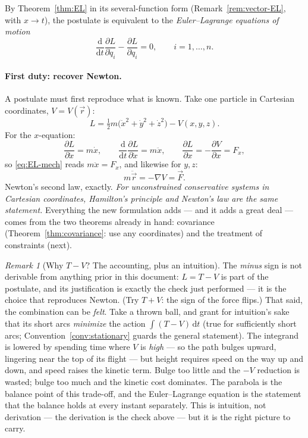 \documentclass[11pt]{article}
\theoremstyle{plain}
\theoremstyle{definition}
\theoremstyle{remark}
\newtheorem{remark}[theorem]{Remark}
\newcommand{\dd}{\mathrm{d}}
\newcommand{\pd}[2]{\frac{\partial #1}{\partial #2}}
\newcommand{\vr}{\vec{r}}
\begin{document}
By Theorem~\ref{thm:EL} in its several-function form
(Remark~\ref{rem:vector-EL}, with $x \to t$), the postulate is equivalent
to the \emph{Euler--Lagrange equations of motion}
\begin{equation}
  \boxed{\;
  \frac{\dd}{\dd t}\pd{L}{\dot q_i} - \pd{L}{q_i} = 0,
  \qquad i = 1, \dots, n .
  \;}
  \label{eq:EL-mech}
\end{equation}

\paragraph{First duty: recover Newton.}
A postulate must first reproduce what is known. Take one particle
in Cartesian coordinates, $V = V(\vr)$:
\begin{equation}
  L = \tfrac12 m\bigl(\dot x^2 + \dot y^2 + \dot z^2\bigr) - V(x,y,z).
\end{equation}
For the $x$-equation:
\begin{equation}
  \pd{L}{\dot x} = m\dot x,
  \qquad
  \frac{\dd}{\dd t}\pd{L}{\dot x} = m\ddot x,
  \qquad
  \pd{L}{x} = -\pd{V}{x} = F_x ,
\end{equation}
so \eqref{eq:EL-mech} reads $m\ddot x = F_x$, and likewise for $y, z$:
\begin{equation}
  m\ddot\vr = -\nabla V = \vec F .
\end{equation}
Newton's second law, exactly. \emph{For unconstrained conservative systems
in Cartesian coordinates, Hamilton's principle and Newton's law are the
same statement.} Everything the new formulation adds --- and it adds a
great deal --- comes from the two theorems already in hand:
covariance (Theorem~\ref{thm:covariance}: use any coordinates) and the
treatment of constraints (next).

\begin{remark}[Why $T - V$? The accounting, plus an intuition]
The \emph{minus} sign is not derivable from anything prior in this
document: $L = T - V$ is part of the postulate, and its justification is
exactly the check just performed --- it is the choice that reproduces
Newton. (Try $T + V$: the sign of the force flips.) That said, the
combination can be \emph{felt}. Take a thrown ball, and grant for
intuition's sake that its short arcs \emph{minimize} the action
$\int (T - V)\,\dd t$ (true for sufficiently short arcs;
Convention~\ref{conv:stationary} guards the general statement). The
integrand is lowered by spending time where $V$ is \emph{high} --- so the
path bulges upward, lingering near the top of its flight --- but height
requires speed on the way up and down, and speed raises the kinetic
term. Bulge
too little and the $-V$ reduction is wasted; bulge too much and the
kinetic cost dominates. The parabola is the balance point of this
trade-off, and
the Euler--Lagrange equation is the statement that the balance holds at
every instant separately. This is intuition, not derivation --- the
derivation is the check above --- but it is the right picture to carry.
\end{remark}
\end{document}
